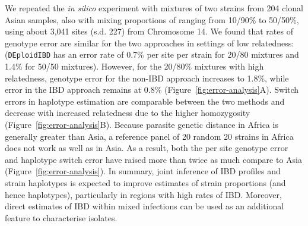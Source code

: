 \documentclass[9pt,lineno]{elife}
\begin{document}
We repeated the \emph{in silico} experiment with mixtures of two strains from 204 clonal Asian samples, also with mixing proportions of ranging from 10/90\% to 50/50\%, using about 3,041 sites (s.d. 227) from Chromosome 14. We found that rates of genotype error are similar for the two approaches in settings of low relatedness: ({\tt DEploidIBD} has an error rate of 0.7\% per site per strain for 20/80 mixtures and 1.4\% for 50/50 mixtures).  However, for the 20/80\% mixtures with high relatedness, genotype error for the non-IBD approach increases to 1.8\%, while error in the IBD approach remains at 0.8\% (Figure~\ref{fig:error-analysis}A). Switch errors in haplotype estimation are comparable between the two methods and decrease with increased relatedness due to the higher homozygosity (Figure~\ref{fig:error-analysis}B).
Because parasite genetic distance in Africa is generally greater than Asia, a reference panel of 20 random 20 strains in Africa does not work as well as in Asia. As a result, both the per site genotype error and haplotype switch error have raised more than twice as much compare to Asia (Figure~\ref{fig:error-analysis}).
In summary, joint inference of IBD profiles and strain haplotypes is expected to improve estimates of strain proportions (and hence haplotypes), particularly in regions with high rates of IBD. Moreover, direct estimates of IBD within mixed infections can be used as an additional feature to characterise isolates.
\end{document}
